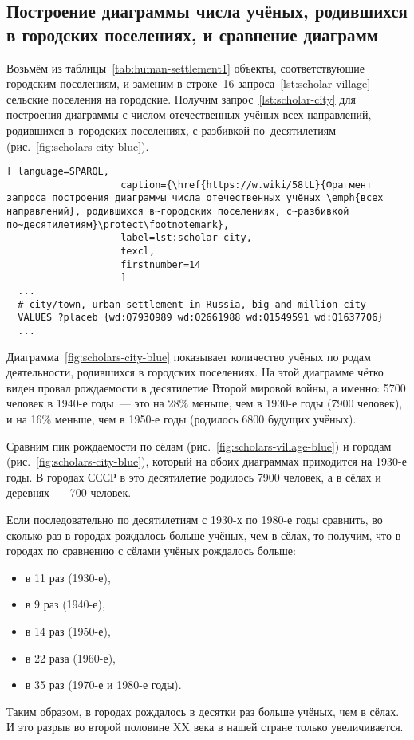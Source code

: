 \subsection{Построение диаграммы числа учёных, родившихся в городских поселениях, и сравнение диаграмм}

Возьмём из таблицы~\ref{tab:human-settlement1} объекты, соответствующие городским поселениям, 
и заменим в строке~16 запроса~\ref{lst:scholar-village} сельские поселения на городские. 
Получим запрос~\ref{lst:scholar-city} для построения диаграммы 
с числом отечественных учёных всех направлений, родившихся в~городских поселениях, 
с разбивкой по~десятилетиям (рис.~\ref{fig:scholars-city-blue}). 

\newpage

\begin{lstlisting}[ language=SPARQL, 
                    caption={\href{https://w.wiki/58tL}{Фрагмент запроса построения диаграммы числа отечественных учёных \emph{всех направлений}, родившихся в~городских поселениях, с~разбивкой по~десятилетиям}\protect\footnotemark},
                    label=lst:scholar-city,
                    texcl, 
                    firstnumber=14
                    ]
  ...
  # city/town, urban settlement in Russia, big and million city
  VALUES ?placeb {wd:Q7930989 wd:Q2661988 wd:Q1549591 wd:Q1637706}
  ...
\end{lstlisting}%

Диаграмма~\ref{fig:scholars-city-blue} показывает количество учёных по родам деятельности, родившихся в городских поселениях.
На этой диаграмме чётко виден провал рождаемости в десятилетие Второй мировой войны, 
а именно: 5700 человек в 1940-е годы~--- это на 28\% меньше, чем в 1930-е годы (7900 человек), 
и на 16\% меньше, чем в 1950-е годы (родилось 6800 будущих учёных). 

Сравним пик рождаемости по сёлам (рис.~\ref{fig:scholars-village-blue}) 
                       и городам (рис.~\ref{fig:scholars-city-blue}), 
который на обоих диаграммах приходится на 1930-е годы. 
В городах СССР в это десятилетие родилось 7900 человек, а в сёлах и деревнях~--- 700 человек. 

Если последовательно по десятилетиям с 1930-х по 1980-е годы 
сравнить, во сколько раз в городах рождалось больше учёных, чем в сёлах, 
то получим, что в городах по сравнению с сёлами учёных рождалось больше:
\begin{itemize}
  \item в 11 раз (1930-е), 
  \item в 9 раз (1940-е), 
  \item в 14 раз (1950-е), 
  \item в 22 раза (1960-е), 
  \item в 35 раз (1970-е и 1980-е годы).
\end{itemize}

Таким образом, в городах рождалось в десятки раз больше учёных, чем в сёлах. 
И это разрыв во второй половине XX века в нашей стране только увеличивается. 
